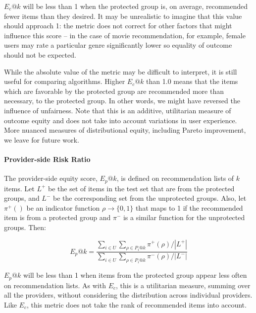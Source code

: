         
            $E_c@k$ will be less than 1 when the protected group is, on average, recommended fewer items than they desired. It may be unrealistic to imagine that this value should approach 1: the metric does not correct for other factors that might influence this score -- in the case of movie recommendation, for example, female users may rate a particular genre significantly lower so equality of outcome should not be expected.
            
            While the absolute value of the metric may be difficult to interpret, it is still useful for comparing algorithms. Higher $E_c@k$ than 1.0 means that the items which are favorable by the protected group are recommended more than necessary, to the protected group. In other words, we might have reversed the influence of unfairness. Note that this is an additive, utilitarian measure of outcome equity and does not take into account variations in user experience. More nuanced measures of distributional equity, including Pareto improvement, we leave for future work.
        
        \vspace{0.25cm}
        \noindent \paragraph{Provider-side Risk Ratio}
        \vspace{0.25cm}
        
            The provider-side equity score, $E_p@k$, is defined on recommendation lists of $k$ items. Let $L^+$ be the set of items in the test set that are from the protected groups, and $L^-$ be the corresponding set from the unprotected groups. Also, let $\pi^+()$ be an indicator function $\rho \rightarrow \{0,1\}$ that maps to 1 if the recommended item is from a protected group and $\pi^-$ is a similar function for the unprotected groups. Then:

            \begin{equation}
            E_p@k=\frac{\sum_{i \in U}{\sum_{\rho \in P_i@k}{\pi^+(\rho)}}/|L^+|}
            {\sum_{i \in U}{\sum_{\rho \in P_i@k}{\pi^-(\rho)}}/|L^-|}
            \end{equation}
            \vspace{0.25cm}
        
            $E_p@k$ will be less than 1 when items from the protected group appear less often on recommendation lists. As with $E_c$, this is a utilitarian measure, summing over all the providers, without considering the distribution across individual providers. Like $E_c$, this metric does not take the rank of recommended items into account.
            


